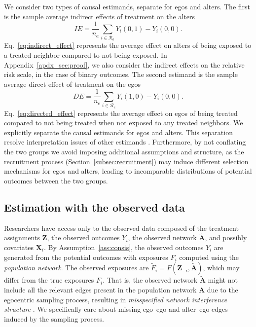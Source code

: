 \documentclass[11pt]{article}
\theoremstyle{definition}
\def \bZ {\boldsymbol{Z}}
\def \bA {\boldsymbol{A}}
\def \bX {\boldsymbol{X}}
\def \cR {\mathcal{R}}
\def \EX {\mathbb{E}}
\begin{document}
We consider two types of causal estimands, separate for egos and alters.
The first is the sample average indirect effects of treatment on the alters 
\begin{equation}
    \label{eq:indirect_effect}
    IE = 
    \frac{1}{n_a} 
    \sum_{i\in\cR_a}
    Y_i(0, 1) - Y_i(0,0).
\end{equation}
Eq.~\eqref{eq:indirect_effect} represents the average effect on alters of being exposed to a treated neighbor compared to not being exposed.
In Appendix~\ref{apdx_sec:proof}, we also consider the indirect effects on the relative risk scale, in the case of binary outcomes.
The second estimand is the sample average direct effect of treatment on the egos
\begin{equation}
    \label{eq:directed_effect} 
    DE = 
    \frac{1}{n_e}
    \sum_{i\in\cR_e}
    Y_i(1, 0) - Y_i(0,0).
\end{equation}
Eq.~\eqref{eq:directed_effect} represents the average effect on egos of being treated compared 
    to not being treated when not exposed to any treated neighbors.
We explicitly separate the causal estimands for egos and alters.
This separation resolve interpretation issues of other estimands \citep{Crawford2019}.
Furthermore, by not conflating the two groups we avoid imposing additional assumptions and structure,
as the recruitment process (Section~\ref{subsec:recruitment}) may induce different selection mechanisms for egos and alters, 
leading to incomparable distributions of potential outcomes between the two groups.

\subsection{Estimation with the observed data}
Researchers have access only to the observed data composed of the treatment assignments $\bZ$,
the observed outcomes $Y_i$, the observed network $\widetilde{\bA}$, and possibly
covariates $\bX_i$.
By Assumption~\ref{ass:consis}, the observed outcomes $Y_i$
are generated from the potential outcomes with exposures $F_i$ 
computed using the \emph{population network}.
The observed exposures are $\widetilde{F}_i = F(\bZ_{-i}, \widetilde{\bA})$,
which may differ from the true exposures $F_i$. 
That is, the observed network $\widetilde{\bA}$ might not include all the relevant edges present in the population network $\bA$ 
due to the egocentric sampling process, resulting in \emph{misspecified network interference structure} \citep{Weinstein2023}.
We specifically care about missing ego--ego and alter--ego edges induced by the sampling process.
\end{document}
